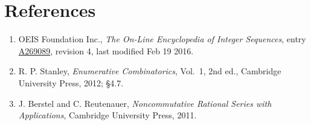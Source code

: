 \documentclass[11pt]{article}
\theoremstyle{definition}
\begin{document}
\section{References}

\begin{enumerate}

\item OEIS Foundation Inc., \emph{The On-Line Encyclopedia of Integer Sequences}, entry \href{https://oeis.org/A269089}{A269089}, revision 4, last modified Feb 19 2016.

\item R. P. Stanley, \emph{Enumerative Combinatorics}, Vol.~1, 2nd ed., Cambridge University Press, 2012; \S4.7.

\item J. Berstel and C. Reutenauer, \emph{Noncommutative Rational Series with Applications}, Cambridge University Press, 2011.

\end{enumerate}
\end{document}
